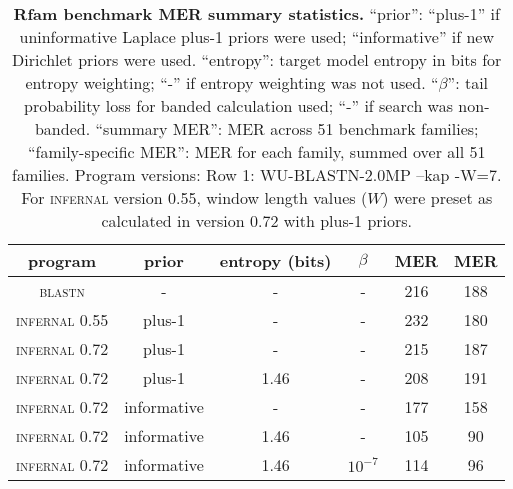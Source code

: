 \begin{table}[htb]
\begin{center}
\begin{tabular}{cccccc}
\multicolumn{1}{c}{program} &
\multicolumn{1}{c}{prior} & \multicolumn{1}{c}{entropy (bits)} &
\multicolumn{1}{c}{$\beta$} & \multicolumn{1}{c}{MER} &
\multicolumn{1}{c}{MER} \\ \hline
\textsc{blastn}         & -           & -    & -         & 216 & 188 \\
\textsc{infernal} 0.55  & plus-1      & -    & -         & 232 & 180 \\ %
\textsc{infernal} 0.72  & plus-1      & -    & -         & 215 & 187 \\ 
\textsc{infernal} 0.72  & plus-1      & 1.46 & -         & 208 & 191 \\ 
\textsc{infernal} 0.72  & informative & -    & -         & 177 & 158 \\ 
\textsc{infernal} 0.72  & informative & 1.46 & -         & 105 &  90 \\ 
\textsc{infernal} 0.72  & informative & 1.46 & $10^{-7}$ & 114 &  96 \\ 
\end{tabular}
\end{center}
\caption{\textbf{Rfam benchmark MER summary statistics.} 
    ``prior'': ``plus-1'' if uninformative Laplace plus-1 priors were
    used; ``informative'' if new Dirichlet priors were used.
    ``entropy'': target model entropy in bits for entropy weighting; ``-''
    if entropy weighting was not used.
    ``$\beta$'': tail probability loss for banded calculation used; ``-'' if search
    was non-banded. ``summary MER'': MER across 51 benchmark
    families; ``family-specific MER'': MER for each family, summed
    over all 51 families. Program versions: Row 1: WU-BLASTN-2.0MP
    --kap -W=7. For \textsc{infernal} version 0.55, window length values ($W$)
    were preset as calculated in version 0.72 with plus-1 priors.}
\label{tbl:rmarkmerlist}
\end{table}

